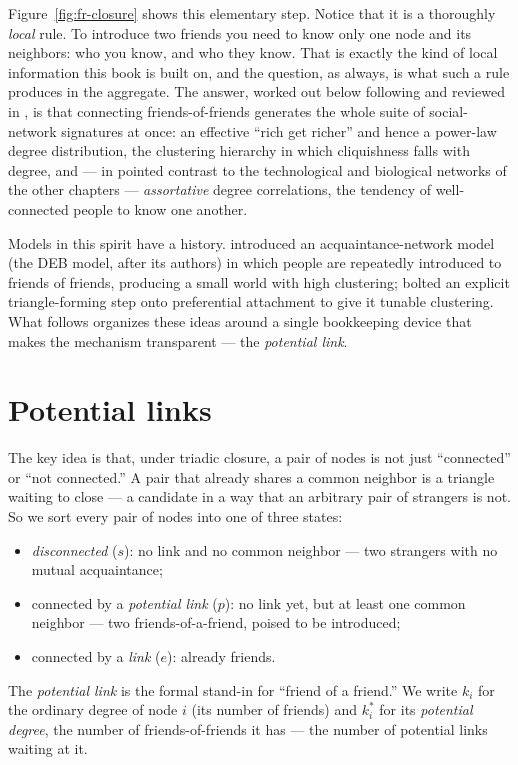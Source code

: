 Figure~\ref{fig:fr-closure} shows this elementary step. Notice that it is a
thoroughly \emph{local} rule. To introduce two friends you
need to know only one node and its neighbors: who you know, and who they know.
That is exactly the kind of local information this book is built on, and the
question, as always, is what such a rule produces in the aggregate. The answer,
worked out below following \citet{vazquez2003} and reviewed in
\citet{vazquez2025}, is that connecting friends-of-friends generates the whole
suite of social-network signatures at once: an effective ``rich get richer'' and
hence a power-law degree distribution, the clustering hierarchy in which
cliquishness falls with degree, and --- in pointed contrast to the technological
and biological networks of the other chapters --- \emph{assortative} degree
correlations, the tendency of well-connected people to know one another.

Models in this spirit have a history. \citet{davidsen2002} introduced an
acquaintance-network model (the DEB model, after its authors) in which people are
repeatedly introduced to friends of friends, producing a small world with high
clustering; \citet{holme2002} bolted an explicit triangle-forming step onto
preferential attachment to give it tunable clustering. What follows organizes
these ideas around a single bookkeeping device that makes the mechanism
transparent --- the \emph{potential link}.

\section{Potential links}

The key idea is that, under triadic closure, a pair of nodes is not just
``connected'' or ``not connected.'' A pair that already shares a common neighbor
is a triangle waiting to close --- a candidate in a way that an arbitrary pair of
strangers is not. So we sort every pair of nodes into one of three states:
\begin{itemize}
  \item \emph{disconnected} ($s$): no link and no common neighbor --- two
    strangers with no mutual acquaintance;
  \item connected by a \emph{potential link} ($p$): no link yet, but at least one
    common neighbor --- two friends-of-a-friend, poised to be introduced;
  \item connected by a \emph{link} ($e$): already friends.
\end{itemize}
The \emph{potential link} is the formal stand-in for ``friend of a friend.'' We
write $k_i$ for the ordinary degree of node $i$ (its number of friends) and
$k^*_i$ for its \emph{potential degree}, the number of friends-of-friends it has
--- the number of potential links waiting at it.

